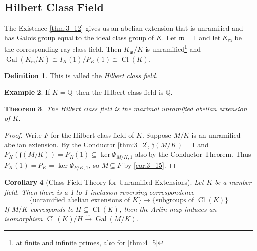 \documentclass[11pt]{article}
\theoremstyle{definition}
\newtheorem{definition}{Definition}[section]
\newtheorem{example}[definition]{Example}
\theoremstyle{plain}
\newtheorem{theorem}[definition]{Theorem}
\newtheorem{corollary}[definition]{Corollary}
\theoremstyle{remark}
\DeclareMathOperator{\Gal}{Gal}
\DeclareMathOperator{\Cl}{Cl}
\newcommand{\QQ}{\mathbb{Q}}
\newcommand{\ff}{\mathfrak{f}}
\newcommand{\fm}{\mathfrak{m}}
\begin{document}
\subsection{Hilbert Class Field}

The Existence \autoref{thm:3_12} gives us an abelian extension that is unramified and has Galois group equal to the ideal class group of $K$. Let $\fm = 1$ and let $K_\fm$ be the corresponding ray class field. Then $K_\fm / K$ is unramified\footnote{at finite and infinite primes, also for \autoref{thm:4_5}} and $\Gal(K_\fm/K) \cong I_K(1) / P_K(1) \cong \Cl(K)$.


\begin{definition}\label{def:4_3}
    This is called the \emph{Hilbert class field}.
\end{definition}

\begin{example}\label{eg:4_4}
    If $K = \QQ$, then the Hilbert class field is $\QQ$.
\end{example}

\begin{theorem}\label{thm:4_5}
    The Hilbert class field is the maximal unramified abelian extension of $K$.
\end{theorem}
\begin{proof}
    Write $F$ for the Hilbert class field of $K$. Suppose $M/K$ is an unramified abelian extension. By the Conductor \autoref{thm:3_2}, $\ff(M/K) = 1$ and $P_K(\ff(M/K)) = P_K(1) \subseteq \ker \Phi_{M/K, 1}$ also by the Conductor Theorem. Thus $P_K(1) = P_K = \ker \Phi_{F/K, 1}$, so $M \subseteq F$ by \autoref{cor:3_15}.
\end{proof}

\begin{corollary}[Class Field Theory for Unramified Extensions]\label{cor:4_6}
    Let $K$ be a number field. Then there is a 1-to-1 inclusion reversing correspondence
    \begin{equation*}
        \{\text{unramified abelian extensions of } K\} \longrightarrow \{\text{subgroups of } \Cl(K)\}
    \end{equation*}
    If $M/K$ corresponds to $H \subseteq \Cl(K)$, then the Artin map induces an isomorphism $\Cl(K)/H \xrightarrow{\sim} \Gal(M/K)$.
\end{corollary}
\end{document}
